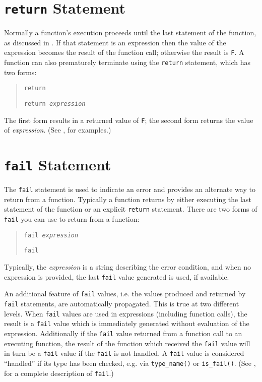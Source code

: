 \section{{\tt return} Statement}
\label{return-stmt}

Normally a function's execution
proceeds until the last statement of the function, as discussed in 
.   If that statement
is an expression then the value of the expression becomes the result
of the function call; otherwise the result is {\tt F}.  A function
can also prematurely terminate using the {\tt return} statement,
which has two forms:
\begin{quote}
    {\tt return}

    {\tt return {\em expression}}
\end{quote}
The first form results in a returned value of {\tt F}; the second
form returns the value of {\em expression}. (See , for examples.)

\section{{\tt fail} Statement}
\label{fail-stmt-1}

The {\tt fail} statement is used to indicate an error and provides
an alternate way to return from a function.  Typically a function returns 
by either executing the last statement of the function or an
explicit {\tt return} statement. There are two forms of {\tt fail} you can
use to return from a function:

\begin{quote}
    {\tt fail {\em expression}}

    {\tt fail}
\end{quote}
Typically, the {\em expression} is a string describing the error
condition, and when no expression is provided, the last {\tt fail}
value generated is used, if available.

An additional feature of {\tt fail} values, i.e. the values produced
and returned by {\tt fail} statements, are automatically propagated.
This is true at two different levels. When {\tt fail} values are used
in expressions (including function calls), the result is a {\tt fail}
value which is immediately generated without evaluation of the expression.
Additionally if the {\tt fail} value returned from a function call to
an executing function, the result of the function which received the
{\tt fail} value will in turn be a {\tt fail} value if the {\tt fail}
is not handled. A {\tt fail} value is considered ``handled'' if its
type has been checked, e.g. via {\tt type\_name()} or {\tt is\_fail()}.
(See , for a complete description of {\tt fail}.)

